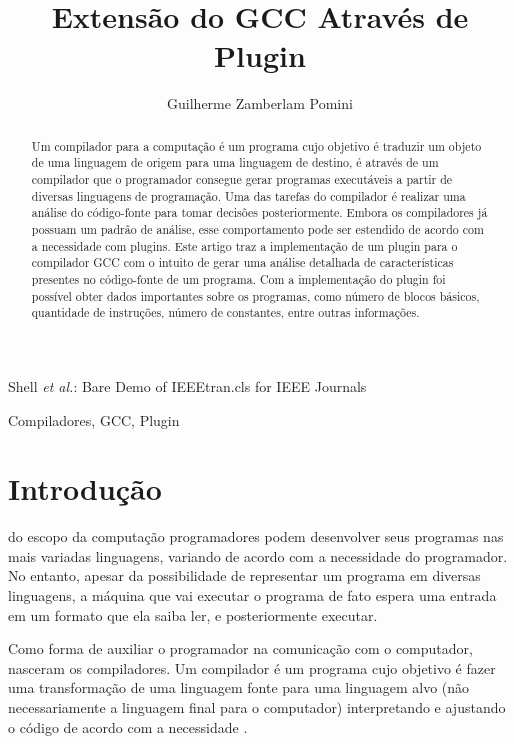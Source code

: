 \documentclass[journal]{IEEEtran}
\begin{document}
\title{Extensão do GCC Através de Plugin}

\author{Guilherme Zamberlam Pomini}
%
{Shell \MakeLowercase{\textit{et al.}}: Bare Demo of IEEEtran.cls for IEEE Journals}
\maketitle
\begin{abstract}
Um compilador para a computação é um programa cujo objetivo é traduzir um objeto de uma linguagem de origem para uma linguagem de destino, é através de um compilador que o programador consegue gerar programas executáveis a partir de diversas linguagens de programação. Uma das tarefas do compilador é realizar uma análise do código-fonte para tomar decisões posteriormente. Embora os compiladores já possuam um padrão de análise, esse comportamento pode ser estendido de acordo com a necessidade com plugins. Este artigo traz a implementação de um plugin para o compilador GCC com o intuito de gerar uma análise detalhada de características presentes no código-fonte de um programa. Com a implementação do plugin foi possível obter dados importantes sobre os programas, como número de blocos básicos, quantidade de instruções, número de constantes, entre outras informações.
\end{abstract}
\begin{IEEEkeywords}
Compiladores, GCC, Plugin
\end{IEEEkeywords}
\IEEEpeerreviewmaketitle

\section{Introdução}

 do escopo da computação programadores podem desenvolver seus programas nas mais variadas linguagens, variando de acordo com a necessidade do programador. No entanto, apesar da possibilidade de representar um programa em diversas linguagens, a máquina que vai executar o programa de fato espera uma entrada em um formato que ela saiba ler, e posteriormente executar.

Como forma de auxiliar o programador na comunicação com o computador, nasceram os compiladores. Um compilador é um programa cujo objetivo é fazer uma transformação de uma linguagem fonte para uma linguagem alvo (não necessariamente a linguagem final para o computador) interpretando e ajustando o código de acordo com a necessidade \cite{livro}.
\end{document}
